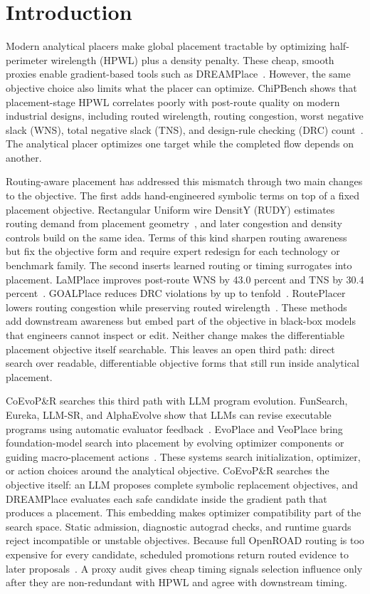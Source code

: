 \section{Introduction}

Modern analytical placers make global placement tractable by optimizing
half-perimeter wirelength (HPWL) plus a density penalty. These cheap, smooth
proxies enable gradient-based tools such as DREAMPlace~\cite{dreamplace}.
However, the same objective choice also limits
what the placer can optimize. ChiPBench shows that placement-stage HPWL
correlates poorly with post-route quality on modern industrial designs,
including routed wirelength, routing congestion, worst negative slack (WNS),
total negative slack (TNS), and design-rule checking (DRC)
count~\cite{chipbench}. The analytical placer optimizes one target while the
completed flow depends on another.

Routing-aware placement has addressed this mismatch through two main changes
to the objective. The first adds hand-engineered symbolic terms on top of a
fixed placement objective. Rectangular Uniform wire DensitY (RUDY) estimates
routing demand from placement geometry~\cite{rudy}, and later congestion and
density controls build on the same idea. Terms of this kind sharpen routing
awareness but fix the objective form and require expert redesign for each
technology or benchmark family. The second inserts learned routing or timing
surrogates into placement. LaMPlace improves post-route WNS by 43.0 percent
and TNS by 30.4 percent~\cite{lamplace}. GOALPlace reduces DRC violations by
up to tenfold~\cite{goalplace}. RoutePlacer lowers routing congestion while
preserving routed wirelength~\cite{routeplacer}. These methods add downstream
awareness but embed part of the objective in black-box models that engineers
cannot inspect or edit. Neither change makes the differentiable placement
objective itself searchable. This leaves an open third path: direct search over
readable, differentiable objective forms that still run inside analytical
placement.

CoEvoP\&R searches this third path with LLM program evolution. FunSearch,
Eureka, LLM-SR, and AlphaEvolve show that LLMs can revise executable programs
using automatic evaluator feedback~\cite{funsearch,eureka,llmsr,alphaevolve}.
EvoPlace and VeoPlace bring foundation-model search into placement by evolving
optimizer components or guiding macro-placement
actions~\cite{evoplace,veoplace}. These systems search initialization,
optimizer, or action choices around the analytical objective. CoEvoP\&R
searches the objective itself: an LLM proposes complete symbolic replacement objectives,
and DREAMPlace evaluates each safe candidate inside the gradient path that
produces a placement. This embedding makes optimizer
compatibility part of the search space. Static admission, diagnostic autograd
checks, and runtime guards reject incompatible or unstable objectives. Because
full OpenROAD routing is too expensive for every candidate, scheduled
promotions return routed evidence to later proposals~\cite{openroad}. A proxy
audit gives cheap timing signals selection influence only after they are
non-redundant with HPWL and agree with downstream timing.

